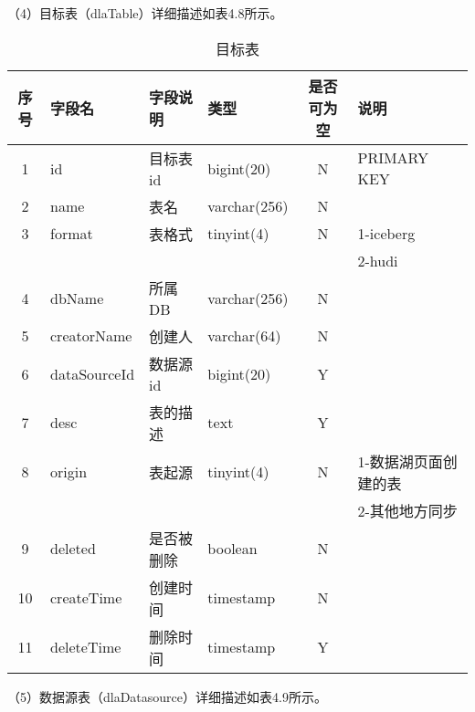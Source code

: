 （4）目标表（dlaTable）详细描述如表4.8所示。

\begin{table}[h]
  \centering
  \caption{目标表}
  \label{tab:exampletable}
  \begin{tabular}{clllcl}
    \toprule
    序号  & 字段名              & 字段说明     & 类型           & 是否可为空   & 说明  \\
    \midrule
    1    & id                 & 目标表id     & bigint(20)    & N          & PRIMARY KEY    \\
    2    & name               & 表名         & varchar(256)  & N          &    \\
    3    & format             & 表格式       & tinyint(4)    & N          & 1-iceberg  \\
         &                    &             &               &            & 2-hudi  \\
    4    & dbName             & 所属DB       & varchar(256)  & N          &   \\
    5    & creatorName        & 创建人       & varchar(64)   & N          &   \\
    6    & dataSourceId       & 数据源id     & bigint(20)    & Y          &    \\
    7    & desc               & 表的描述     & text           & Y          &   \\
    8    & origin             & 表起源       & tinyint(4)    & N          & 1-数据湖页面创建的表   \\
         &                    &             &               &            & 2-其他地方同步  \\
    9    & deleted            & 是否被删除    & boolean       & N          &   \\
    10   & createTime         & 创建时间     & timestamp     & N          &    \\
    11   & deleteTime         & 删除时间     & timestamp     & Y          &   \\
    \bottomrule
  \end{tabular}
\end{table}

（5）数据源表（dlaDatasource）详细描述如表4.9所示。


